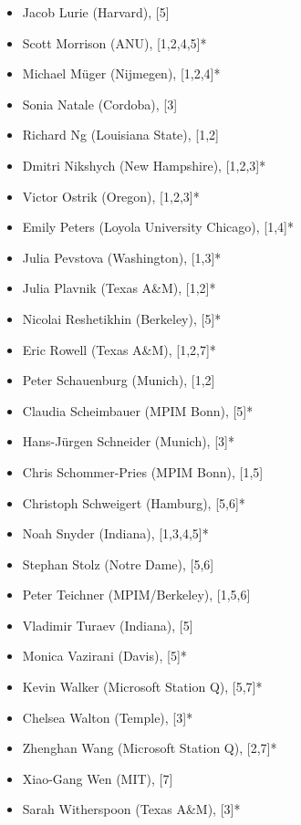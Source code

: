 \documentclass[12pt]{article}
\begin{document}
\begin{multicols}{2}
\begin{itemize}
\item Jacob Lurie (Harvard), [5]
\item Scott Morrison (ANU), [1,2,4,5]*
\item Michael M\"uger (Nijmegen), [1,2,4]*
\item Sonia Natale (Cordoba), [3]
\item Richard Ng (Louisiana State), [1,2]
\item Dmitri Nikshych (New Hampshire), [1,2,3]*
\item Victor Ostrik (Oregon), [1,2,3]*
\item Emily Peters (Loyola University Chicago), [1,4]*
\item Julia Pevstova (Washington), [1,3]*
\item Julia Plavnik (Texas A\&M), [1,2]*
\item Nicolai Reshetikhin (Berkeley), [5]*
\item Eric Rowell (Texas A\&M), [1,2,7]*
\item Peter Schauenburg (Munich), [1,2]
\item Claudia Scheimbauer (MPIM Bonn), [5]*
\item Hans-J\"urgen Schneider (Munich), [3]*
\item Chris Schommer-Pries (MPIM Bonn), [1,5]
\item Christoph Schweigert (Hamburg), [5,6]*
\item Noah Snyder (Indiana), [1,3,4,5]*
\item Stephan Stolz (Notre Dame), [5,6]
\item Peter Teichner (MPIM/Berkeley), [1,5,6]
\item Vladimir Turaev (Indiana), [5]
\item Monica Vazirani (Davis), [5]*
\item Kevin Walker (Microsoft Station Q), [5,7]*
\item Chelsea Walton (Temple), [3]*
\item Zhenghan Wang (Microsoft Station Q), [2,7]*
\item Xiao-Gang Wen (MIT), [7]
\item Sarah Witherspoon (Texas A\&M), [3]*
\end{itemize}
\end{multicols}
\end{document}
